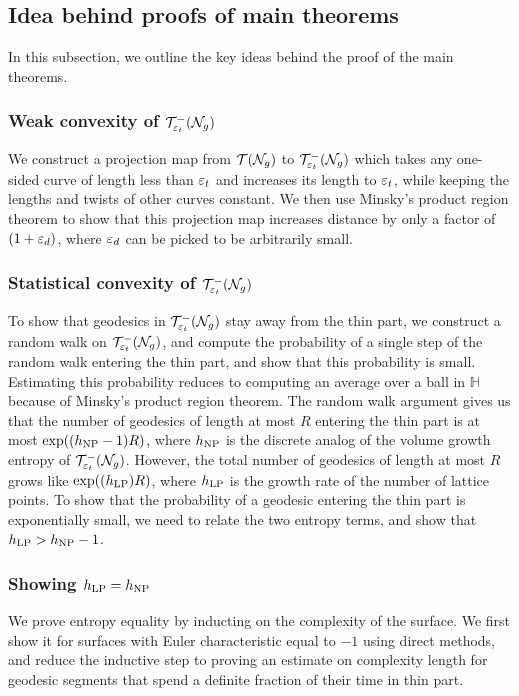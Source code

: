 
\subsection*{Idea behind proofs of main theorems}

In this subsection, we outline the key ideas behind the proof of the main theorems.

\subsubsection*{Weak convexity of $\mathcal{T}_{\varepsilon_t}^{-}(\mathcal{N}_g)$}
We construct a projection map from $\mathcal{T}(\mathcal{N}_g)$ to $\mathcal{T}_{\varepsilon_t}^{-}(\mathcal{N}_g)$ which takes any one-sided curve of length less than $\varepsilon_t$ and increases its length to $\varepsilon_t$, while keeping the lengths and twists of other curves constant.
We then use Minsky's product region theorem to show that this projection map increases distance by only a factor of $(1 + \varepsilon_d)$, where $\varepsilon_d$ can be picked to be arbitrarily small.

\subsubsection*{Statistical convexity of $\mathcal{T}_{\varepsilon_t}^{-}(\mathcal{N}_g)$}
To show that geodesics in $\mathcal{T}_{\varepsilon_t}^{-}(\mathcal{N}_g)$ stay away from the thin part, we construct a random walk on $\mathcal{T}_{\varepsilon_t}^{-}(\mathcal{N}_g)$, and compute the probability of a single step of the random walk entering the thin part, and show that this probability is small.
Estimating this probability reduces to computing an average over a ball in $\mathbb{H}$ because of Minsky's product region theorem.
The random walk argument gives us that the number of geodesics of length at most $R$ entering the thin part is at most $\exp((h_{\mathrm{NP}} - 1)R)$, where $h_{\mathrm{NP}}$ is the discrete analog of the volume growth entropy of $\mathcal{T}_{\varepsilon_t}^{-}(\mathcal{N}_g)$.
However, the total number of geodesics of length at most $R$ grows like $\exp((h_{\mathrm{LP}})R)$, where $h_{\mathrm{LP}}$ is the growth rate of the number of lattice points.
To show that the probability of a geodesic entering the thin part is exponentially small, we need to relate the two entropy terms, and show that $h_{\mathrm{LP}} > h_{\mathrm{NP}} - 1$.

\subsubsection*{Showing $h_{\mathrm{LP}} = h_{\mathrm{NP}}$}
We prove entropy equality by inducting on the complexity of the surface.
We first show it for surfaces with Euler characteristic equal to $-1$ using direct methods, and reduce the inductive step to proving an estimate on complexity length for geodesic segments that spend a definite fraction of their time in thin part.

